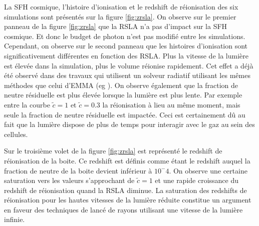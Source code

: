 La \ac{SFH} cosmique, l'histoire d'ionisation et le redshift de réionisation des six simulations sont présentés sur la figure \ref{fig:zrsla}.
On observe sur le premier panneau de la figure \ref{fig:zrsla} que la \ac{RSLA} n'a pas d'impact sur la \ac{SFH} cosmique.
Et donc le budget de photon n'est pas modifié entre les simulations.
Cependant, on observe sur le second panneau que les histoires d'ionisation sont significativement différentes en fonction des \ac{RSLA}.
Plus la vitesse de la lumière est élevée dans la simulation, plus le volume réionise rapidement.
Cet effet a déjà été observé dans des travaux qui utilisent un solveur radiatif utilisant les mêmes méthodes que celui d'EMMA (eg \cite{rosdahl_ramsesrt_2013}).
On observe également que la fraction de neutre résiduelle est plus élevée lorsque la lumière est plus lente.
Par exemple entre la courbe $\tilde{c}=1$ et $\tilde{c}=0.3$ la réionisation à lieu au même moment, mais seule la fraction de neutre résiduelle est impactée.
Ceci est certainement dû au fait que la lumière dispose de plus de temps pour interagir avec le gaz au sein des cellules.

Sur le troisième volet de la figure \ref{fig:zrsla} est représenté le redshift de réionisation de la boite.
Ce redshift est définis comme étant le redshift auquel la fraction de neutre de la boite devient inférieur à $10^-{4}$.
On observe une certaine saturation vers les valeurs s'approchant de $\tilde{c}=1$ et une rapide croissance du redshift de réionisation quand la \ac{RSLA} diminue.
La saturation des redshifts de réionisation pour les hautes vitesses de la lumière réduite constitue un argument en faveur des techniques de lancé de rayons utilisant une vitesse de la lumière infinie.

